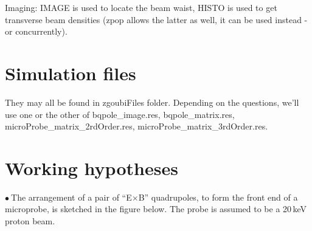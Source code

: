\documentclass[10pt]{article}
\newcommand{\nib}{\noindent \ensuremath{\bullet~}}
\begin{document}
\smallskip
\noindent Imaging: IMAGE is used to locate the beam waist, HISTO is used to get transverse beam densities (zpop allows
the latter as well, it can be used instead - or concurrently). 



\section*{Simulation files}

They may all be found in zgoubiFiles folder. Depending on the questions, we'll use one or the other of 
 bqpole\_image.res,  bqpole\_matrix.res,  microProbe\_matrix\_2rdOrder.res,   microProbe\_matrix\_3rdOrder.res.




\section*{Working hypotheses}

\nib The arrangement of a pair of ``E$\times$B'' quadrupoles, to form the front end of a microprobe, is sketched in the figure below. The probe is assumed to be a 20\,keV proton beam. 
\end{document}
